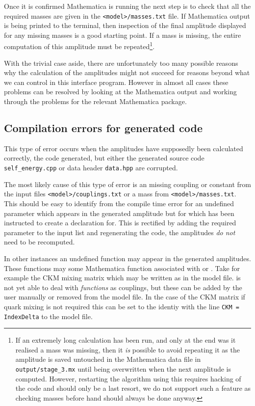 Once it is confirmed Mathematica is running the next step is to check that all the required masses are given in the \lstinline{<model>/masses.txt} file.  If Mathematica output is being printed to the terminal, then inspection of the final amplitude displayed for any missing masses is a good starting point.  If a mass is missing, the entire computation of this amplitude must be repeated\footnote{If an extremely long calculation has been run, and only at the end was it realised a mass was missing, then it \textit{is} possible to avoid repeating it as the amplitude is saved untouched in the Mathematica data file in \lstinline{output/stage_3.mx} until being overwritten when the next amplitude is computed.  However, restarting the algorithm using this requires hacking of the code and should only be a last resort, we do not support such a feature as checking masses before hand should always be done anyway.}.


With the trivial case aside, there are unfortunately too many possible reasons why the calculation of the amplitudes might not succeed for reasons beyond what we can control in this interface program.  However in almost all cases these problems can be resolved by looking at the Mathematica output and working through the problems for the relevant Mathematica package.




\subsection{Compilation errors for generated code}

This type of error occurs when the amplitudes have supposedly been calculated correctly, the code generated, but either the generated source code \lstinline{self_energy.cpp} or data header \lstinline{data.hpp} are corrupted.

The most likely cause of this type of error is an missing coupling or constant from the input files \lstinline{<model>/couplings.txt} or a mass from \lstinline{<model>/masses.txt}.  This should be easy to identify from the compile time error for an undefined parameter which appears in the generated amplitude but for which \mb has been instructed to create a declaration for.  This is rectified by adding the required parameter to the input list and regenerating the code, the amplitudes \textit{do not} need to be recomputed.

In other instances an undefined function may appear in the generated amplitudes.  These functions may some Mathematica function associated with \feyncalc or \feynartss.  Take for example the CKM mixing matrix which may be written as  in the \feynarts model file.  \mb is not yet able to deal with \textit{functions} as couplings, but these can be added by the user manually or removed from the \feynarts model file.  In the case of the CKM matrix if quark mixing is not required this can be set to the identiy with the line \lstinline{CKM = IndexDelta} to the \feynarts model file.

